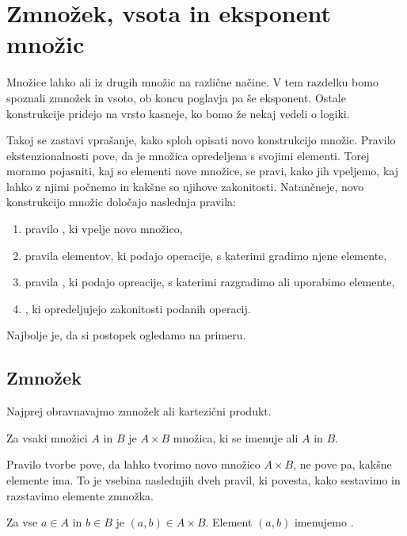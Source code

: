 \section{Zmnožek, vsota in eksponent množic}

Množice lahko  ali  iz drugih množic na različne načine. V
tem razdelku bomo spoznali zmnožek in vsoto, ob koncu poglavja pa še eksponent.
%
Ostale konstrukcije pridejo na vrsto kasneje, ko bomo že nekaj vedeli o logiki.

Takoj se zastavi vprašanje, kako sploh opisati novo konstrukcijo množic. Pravilo
ekstenzionalnosti pove, da je množica opredeljena s svojimi elementi. Torej moramo
pojasniti, kaj so elementi nove množice, se pravi, kako jih vpeljemo, kaj lahko z njimi
počnemo in kakšne so njihove zakonitosti. Natančneje, novo konstrukcijo množic
določajo naslednja pravila:
%
\begin{enumerate}
\item pravilo , ki vpelje novo množico,
\item pravila  elementov, ki podajo operacije, s katerimi gradimo njene elemente,
\item pravila , ki podajo opreacije, s katerimi razgradimo ali uporabimo elemente,
\item {}, ki opredeljujejo zakonitosti podanih operacij.
\end{enumerate}
%
Najbolje je, da si postopek ogledamo na primeru.

\subsection{Zmnožek}
\label{sec:zmnozek}

Najprej obravnavajmo zmnožek ali kartezični produkt.

\begin{pravilo}
  \label{pravilo:zmnozek-tvorba}
  Za vsaki množici $A$ in $B$ je $A \times B$ množica, ki se imenuje  ali
   $A$ in $B$.
\end{pravilo}

\noindent
%
Pravilo tvorbe pove, da lahko tvorimo novo množico $A \times B$, ne pove pa, kakšne
elemente ima. To je vsebina naslednjih dveh pravil, ki povesta, kako sestavimo in
razstavimo elemente zmnožka.

\begin{pravilo}
  \label{pravilo:zmnozek-vpeljava}
  Za vse $a \in A$ in $b \in B$ je $(a, b) \in A \times B$. Element $(a, b)$ imenujemo
  .
\end{pravilo}

